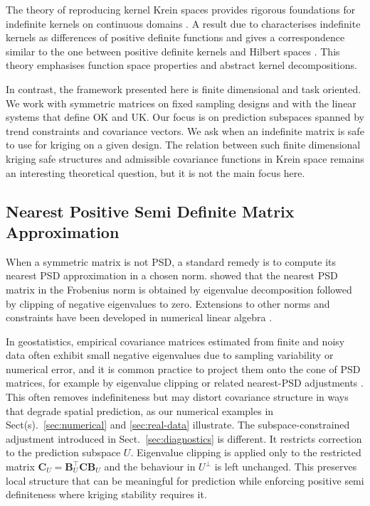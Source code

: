 \documentclass[smallextended]{svjour3}
\newcommand{\1}{\mathbf{1}}
\begin{document}
The theory of reproducing kernel Krein spaces provides rigorous foundations for indefinite kernels on continuous domains \citep{Schwartz1964,Alpay1997}. A result due to \citet{Schwartz1964} characterises indefinite kernels as differences of positive definite functions and gives a correspondence similar to the one between positive definite kernels and Hilbert spaces \citep[see also][]{Alpay1997}. This theory emphasises function space properties and abstract kernel decompositions.

In contrast, the  framework presented here is finite dimensional and task oriented. We work with symmetric matrices on fixed sampling designs and with the linear systems that define OK and UK. Our focus is on prediction subspaces spanned by trend constraints and covariance vectors. We ask when an indefinite matrix is safe to use for kriging on a given design. The relation between such finite dimensional kriging safe structures and admissible covariance functions in Krein space remains an interesting theoretical question, but it is not the main focus here.

\subsection{Nearest Positive Semi Definite Matrix Approximation}

When a symmetric matrix is not PSD, a standard remedy is to compute its nearest PSD approximation in a chosen norm. \citet{Higham1988} showed that the nearest PSD matrix in the Frobenius norm is obtained by eigenvalue decomposition followed by clipping of  negative eigenvalues to zero. Extensions to other norms and constraints have been developed in numerical linear algebra \citep{ChengHigham1998,Higham2002}.

In geostatistics, empirical covariance matrices estimated from finite and noisy data often exhibit small negative eigenvalues due to sampling variability or numerical error, and it is common practice to project them onto the cone of PSD matrices, for example by eigenvalue clipping or related nearest-PSD adjustments \citep[e.g.][]{Higham1988,chilesdelfiner2012}. This often removes indefiniteness but may distort covariance structure in ways that degrade spatial prediction, as our numerical examples in Sect(s).~\ref{sec:numerical} and \ref{sec:real-data} illustrate. The subspace-constrained adjustment introduced in Sect.~\ref{sec:diagnostics} is different. It restricts correction to the prediction subspace $U$. Eigenvalue clipping is applied only to the restricted matrix $\mathbf{C}_U = \mathbf{B}_U^{\top} \mathbf{C} \mathbf{B}_U$ and the behaviour in $U^{\perp}$ is left unchanged. This preserves local structure that can be meaningful for prediction while enforcing positive semi definiteness where kriging stability requires it.
\end{document}

